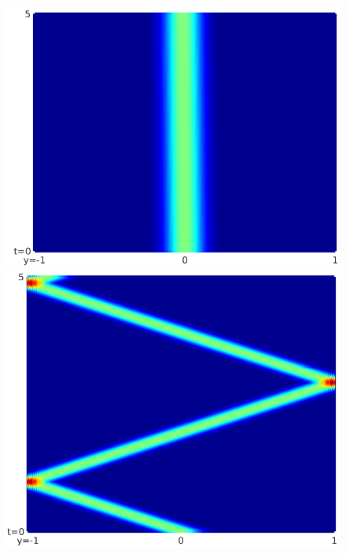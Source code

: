 \documentclass[10pt]{article}
\begin{document}
\begin{figure}[!h]
	\centering 
	\begin{minipage}{0.3\textwidth}
		\includegraphics[scale=0.37]{./figures/plot_frac_schrodinger1_01_1}
	\end{minipage}
	\hspace{0.5cm}	
	\begin{minipage}{0.3\textwidth}
		\includegraphics[scale=0.35]{./figures/plot_frac_schrodinger1_05_1}
	\end{minipage}	
	\hspace{0.2cm}	
	\begin{minipage}{0.3\textwidth}

\end{minipage}
\end{figure}
\end{document}
